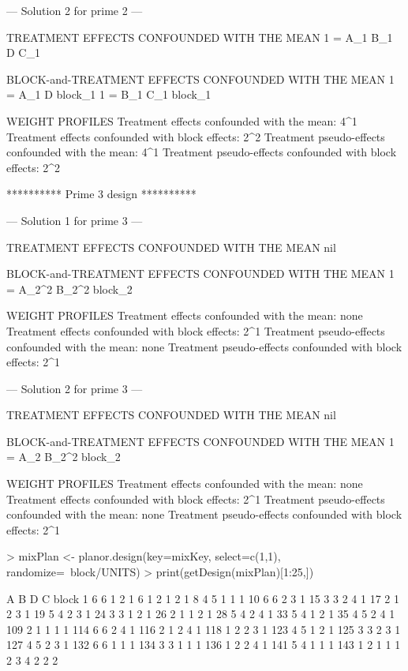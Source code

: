\documentclass[a4paper]{article}
\begin{document}
\begin{Schunk}
\begin{Soutput}
--- Solution  2  for prime  2  ---

TREATMENT EFFECTS CONFOUNDED WITH THE MEAN
1 = A_1 B_1 D C_1

BLOCK-and-TREATMENT EFFECTS CONFOUNDED WITH THE MEAN
1 = A_1 D block_1
1 = B_1 C_1 block_1

WEIGHT PROFILES
Treatment effects confounded with the mean: 4^1 
Treatment effects confounded with block effects: 2^2 
Treatment pseudo-effects confounded with the mean: 4^1 
Treatment pseudo-effects confounded with block effects: 2^2 


********** Prime  3  design **********

--- Solution  1  for prime  3  ---

TREATMENT EFFECTS CONFOUNDED WITH THE MEAN
nil

BLOCK-and-TREATMENT EFFECTS CONFOUNDED WITH THE MEAN
1 = A_2^2  B_2^2  block_2

WEIGHT PROFILES
Treatment effects confounded with the mean: none 
Treatment effects confounded with block effects: 2^1 
Treatment pseudo-effects confounded with the mean: none
Treatment pseudo-effects confounded with block effects: 2^1 

--- Solution  2  for prime  3  ---

TREATMENT EFFECTS CONFOUNDED WITH THE MEAN
nil

BLOCK-and-TREATMENT EFFECTS CONFOUNDED WITH THE MEAN
1 = A_2 B_2^2  block_2

WEIGHT PROFILES
Treatment effects confounded with the mean: none 
Treatment effects confounded with block effects: 2^1 
Treatment pseudo-effects confounded with the mean: none
Treatment pseudo-effects confounded with block effects: 2^1 
\end{Soutput}
\begin{Sinput}
> mixPlan <- planor.design(key=mixKey, select=c(1,1), randomize=~block/UNITS)
> print(getDesign(mixPlan)[1:25,])
\end{Sinput}
\begin{Soutput}
    A B D C block
1   6 6 1 2     1
6   1 2 1 2     1
8   4 5 1 1     1
10  6 6 2 3     1
15  3 3 2 4     1
17  2 1 2 3     1
19  5 4 2 3     1
24  3 3 1 2     1
26  2 1 1 2     1
28  5 4 2 4     1
33  5 4 1 2     1
35  4 5 2 4     1
109 2 1 1 1     1
114 6 6 2 4     1
116 2 1 2 4     1
118 1 2 2 3     1
123 4 5 1 2     1
125 3 3 2 3     1
127 4 5 2 3     1
132 6 6 1 1     1
134 3 3 1 1     1
136 1 2 2 4     1
141 5 4 1 1     1
143 1 2 1 1     1
2   3 4 2 2     2
\end{Soutput}
\end{Schunk}
\end{document}
